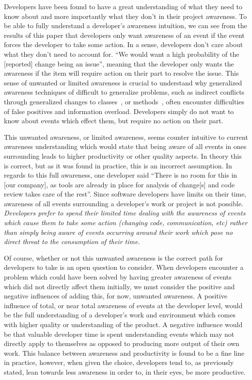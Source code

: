 \documentclass[conference]{IEEEtran}
\begin{document}
Developers have been found to have a great understanding of what they need to know about and more importantly what they don't in
their project awareness. To be able to fully understand a developer's awareness intuition, we can see from the results of this paper that
developers only want awareness of an event if the event forces the developer to take some action. In a sense, developers
don't care about what they don't need to account for. ``We would want a high probability of the [reported] change being an issue'', meaning
that the developer only wants the awareness if the item will require action on their part to resolve the issue.
This sense of unwanted or limited awareness is crucial to understand why generalized
awareness techniques of difficult to generalize problems, such as indirect conflicts through generalized changes to 
classes~\cite{Sarma:2007:TSA}, or methods~\cite{Trainer:2005:BGT,Servant:2010:CPI}, often encounter difficulties of false
positives and information overload. 
Developers simply do not want to know about events which effect them, but require no action on their part. 

This unwanted awareness, or limited awareness, seems counter intuitive to current awareness understanding which would state that
being aware of all events in ones surrounding leads to higher productivity or other quality aspects. In theory this is correct,
but as it was found in practice, this is an incorrect assumption. 
In regards to this full awareness, one developer said ``There is no room for this in [our company], as tools are already in place for 
analysis of change[s] and code review takes care of the rest''. Since software developers have limits on their time, awareness of
all events surrounding a developer's work or project is not possible. \textit{Developers prefer to spend their limited time dealing with
the awareness of events which cause them to take some action (changing code, communication, etc) rather than simply being aware
of events occurring around their work which pose no direct threat to the consumption of their time.}

Of course, whether or not this unwanted awareness is the correct path for developers to take is an open question to consider. When
developers encounter a problem which could have been solved by having greater awareness of events which did not directly affect
them initially, we must consider the positive and negative influences of adding this, for now, unwanted awareness. A positive
influence of total, or near total
awareness of events at the developer level, would be the full understanding of a developer's work and environment which comes
with higher quality or understanding of the product. 
A negative influence would be that valuable developer time is spent understanding events which may not directly apply to themselves as opposed to 
producing more output of their own work. This balance between awareness and productivity is found to be a fine line in practice,
however, when given the choice, developers tend to, as previously stated, lean towards less awareness in order to, in their eyes,
be more productive.
\end{document}
